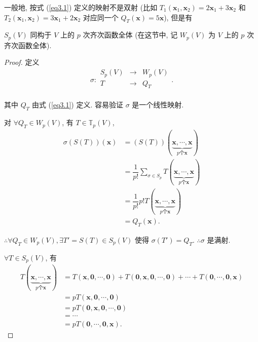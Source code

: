 \documentclass[color=black,device=normal,lang=cn,mode=geye]{elegantnote}
\begin{document}
一般地, 按式 (\ref{eq3.1}) 定义的映射不是双射 (比如 $T_1(\boldsymbol{x}_1,\boldsymbol{x}_2)=2\boldsymbol{x}_1+3\boldsymbol{x}_2$ 和 $T_2(\boldsymbol{x}_1,\boldsymbol{x}_2)=3\boldsymbol{x}_1+2\boldsymbol{x}_2$ 对应同一个 $Q_T(\boldsymbol{x})=5\boldsymbol{x}$), 但是有
\begin{theorem}[书上的定理 3]\label{t3.1}
    $S_p(V)$ 同构于 $V$ 上的 $p$ 次齐次函数全体 (在这节中, 记 $W_p(V)$ 为 $V$ 上的 $p$ 次齐次函数全体).
\end{theorem}
\begin{proof}
    定义
    \[\sigma:\begin{array}{rcl}
        S_p(V) & \rightarrow & W_p(V) \\
        T & \rightarrow & Q_T \\
    \end{array}.\]

    其中 $Q_T$ 由式 (\ref{eq3.1}) 定义. 容易验证 $\sigma$ 是一个线性映射.

    对 $\forall Q_T\in W_p(V)$, 有 $T\in\mathbb{T}_p(V)$,
    \begin{align*}
        \sigma(S(T))(\boldsymbol{x}) & =(S(T))(\underbrace{\boldsymbol{x},\cdots,\boldsymbol{x}}_{p\text{个}\boldsymbol{x}}) \\
        & =\dfrac{1}{p!}\sum\limits_{\sigma\in S_p}T(\underbrace{\boldsymbol{x},\cdots,\boldsymbol{x}}_{p\text{个}\boldsymbol{x}}) \\
        & =\dfrac{1}{p!}p!T(\underbrace{\boldsymbol{x},\cdots,\boldsymbol{x}}_{p\text{个}\boldsymbol{x}}) \\
        & =Q_T(\boldsymbol{x}).
    \end{align*}

    $\therefore\forall Q_T\in W_p(V),\exists T'=S(T)\in S_p(V)$ 使得 $\sigma(T')=Q_T$. $\therefore\sigma$ 是满射.

    $\forall T\in S_p(V)$, 有
    \begin{align*}
        T(\underbrace{\boldsymbol{x},\cdots,\boldsymbol{x}}_{p\text{个}\boldsymbol{x}}) & =T(\boldsymbol{x},\boldsymbol{0},\cdots,\boldsymbol{0})+T(\boldsymbol{0},\boldsymbol{x},\boldsymbol{0},\cdots,\boldsymbol{0})+\cdots+T(\boldsymbol{0},\cdots,\boldsymbol{0},\boldsymbol{x}) \\
        & =pT(\boldsymbol{x},\boldsymbol{0},\cdots,\boldsymbol{0}) \\
        & =pT(\boldsymbol{0},\boldsymbol{x},\boldsymbol{0},\cdots,\boldsymbol{0}) \\
        & =\cdots \\
        & =pT(\boldsymbol{0},\cdots,\boldsymbol{0},\boldsymbol{x}).
    \end{align*}


\end{proof}
\end{document}
